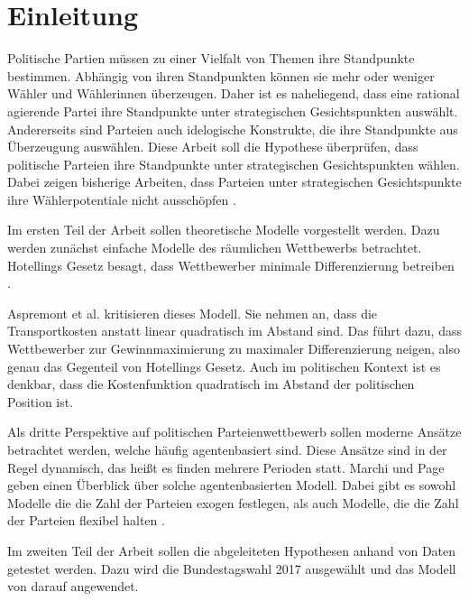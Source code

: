 
\chapter{Einleitung}\label{Kap-Einleitung}
Politische Partien müssen zu einer Vielfalt von Themen ihre Standpunkte bestimmen. Abhängig von ihren Standpunkten können sie mehr oder weniger Wähler und Wählerinnen überzeugen. Daher ist es naheliegend, dass eine rational agierende Partei ihre Standpunkte unter strategischen Gesichtspunkten auswählt. Andererseits sind Parteien auch idelogische Konstrukte, die ihre Standpunkte aus Überzeugung auswählen. Diese Arbeit soll die Hypothese überprüfen, dass politische Parteien ihre Standpunkte unter strategischen Gesichtspunkten wählen. Dabei zeigen bisherige Arbeiten, dass Parteien unter strategischen Gesichtspunkte ihre Wählerpotentiale nicht ausschöpfen \citep{schofield1998germany}.

Im ersten Teil der Arbeit sollen theoretische Modelle vorgestellt werden. Dazu werden  zunächst einfache Modelle des räumlichen Wettbewerbs betrachtet. Hotellings Gesetz besagt, dass Wettbewerber minimale Differenzierung betreiben \citep{hotelling1929}.

Aspremont et al. \citep{aspremont1979} kritisieren dieses Modell. Sie nehmen an, dass die Transportkosten anstatt linear quadratisch im Abstand sind. Das führt dazu, dass Wettbewerber zur Gewinnmaximierung zu maximaler Differenzierung neigen, also genau das Gegenteil von Hotellings Gesetz. Auch im politischen Kontext ist es denkbar, dass die Kostenfunktion quadratisch im Abstand der politischen Position ist.

Als dritte Perspektive auf politischen Parteienwettbewerb sollen moderne Ansätze betrachtet werden, welche häufig agentenbasiert sind. Diese Ansätze sind in der Regel dynamisch, das heißt es finden mehrere Perioden statt. Marchi und Page \citep{marchi2014ABMs} geben einen Überblick über solche agentenbasierten Modell. Dabei gibt es sowohl Modelle die die Zahl der Parteien exogen festlegen, als auch Modelle, die die Zahl der Parteien flexibel halten \citep{laver2007endogenousParties}.

Im zweiten Teil der Arbeit sollen die abgeleiteten Hypothesen anhand von Daten getestet werden. Dazu wird die Bundestagswahl 2017 ausgewählt und das Modell von \citet{laver2005policy} darauf angewendet.

